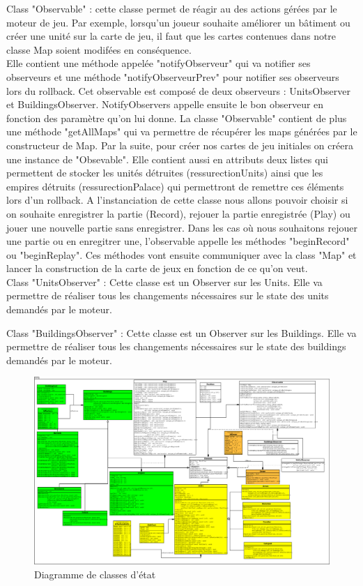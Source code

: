 \documentclass[12pt,a4paper]{article}
\begin{document}
Class "Observable" : cette classe permet de réagir au des actions gérées par le moteur de jeu. Par exemple, lorsqu'un joueur souhaite améliorer un bâtiment ou créer une unité sur la carte de jeu, il faut que les cartes contenues dans notre classe Map soient modifées en conséquence.\\ Elle contient une méthode appelée "notifyObserveur" qui va notifier ses observeurs et une méthode "notifyObserveurPrev" pour notifier ses observeurs lors du rollback.  Cet observable est composé de deux observeurs : UnitsObserver et BuildingsObserver. NotifyObservers appelle ensuite le bon observeur en fonction des paramètre qu'on lui donne. La classe "Observable" contient de plus une méthode "getAllMaps" qui va permettre de récupérer les maps générées par le constructeur de Map. Par la suite, pour créer nos cartes de jeu initiales on créera une instance de "Obsevable". Elle contient aussi en attributs deux listes qui permettent de stocker les unités détruites (ressurectionUnits) ainsi que les empires détruits (ressurectionPalace) qui permettront de remettre ces éléments lors d'un rollback. A l'instanciation de cette classe nous allons pouvoir choisir si on souhaite enregistrer la partie (Record), rejouer la partie enregistrée (Play) ou jouer une nouvelle partie sans enregistrer. Dans les cas où nous souhaitons rejouer une partie ou en enregitrer une, l'observable appelle les méthodes "beginRecord" ou "beginReplay". Ces méthodes vont ensuite communiquer avec la class "Map" et lancer la construction de la carte de jeux en fonction de ce qu'on veut.\\

Class "UnitsObserver" : Cette classe est un Observer sur les Units. Elle va permettre de réaliser tous les changements nécessaires sur le state des units demandés par le moteur.

Class "BuildingsObserver" : Cette classe est un Observer sur les Buildings. Elle va permettre de réaliser tous les changements nécessaires sur le state des buildings demandés par le moteur.

\begin{figure}[!ht]
\centering
    \includegraphics[width=1\textwidth]{ressources/state.png}
     \caption{Diagramme de classes d'état}
\end{figure}
\end{document}
